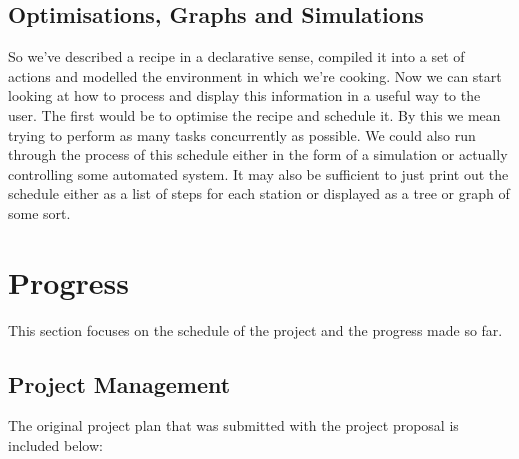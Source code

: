 \documentclass[11pt]{article}
\begin{document}
    \subsection{Optimisations, Graphs and Simulations}

    So we've described a recipe in a declarative sense, compiled it into a set of actions and modelled
    the environment in which we're cooking. Now we can start looking at how to process and display this
    information in a useful way to the user. The first would be to optimise the recipe and schedule it.
    By this we mean trying to perform as many tasks concurrently as possible. We could also run through
    the process of this schedule either in the form of a simulation or actually controlling some automated
    system. It may also be sufficient to just print out the schedule either as a list of steps for each
    station or displayed as a tree or graph of some sort.

    \section{Progress}

    This section focuses on the schedule of the project and the progress made so far.
    
    \subsection{Project Management}

    The original project plan that was submitted with the project proposal is included below:
\end{document}
